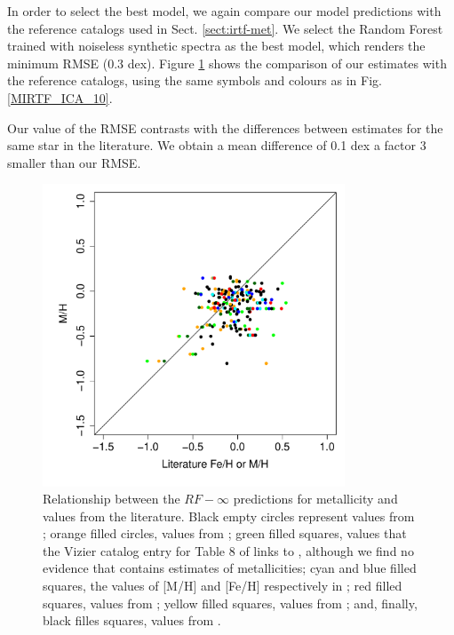 In order to select the best model, we again compare our model
predictions with the reference catalogs used in
Sect. \ref{sect:irtf-met}. We select the Random Forest trained with
noiseless synthetic spectra as the best model, which renders the
minimum RMSE (0.3 dex). Figure \ref{fig:ipac_mt} shows the comparison
of our estimates with the reference catalogs, using the same symbols
and colours as in Fig. \ref{MIRTF_ICA_10}.

Our value of the RMSE contrasts with the differences between estimates
for the same star in the literature. We obtain a mean difference of
0.1 dex a factor 3 smaller than our RMSE. 

\begin{figure}
 \begin{center} \includegraphics[width=9cm]{figs/ipac-figs/M-RFInf.pdf}

\caption{Relationship
 between the $RF-\infty$ predictions for metallicity and values from
 the literature.  Black empty circles represent values
 from \protect\cite{cesetti} ; orange filled circles, values
 from \protect\cite{NevesIII}; green filled squares, values that the
 Vizier catalog entry for Table 8 of \protect\cite{NevesIII} links
 to \protect\cite{Jao}, although we find no evidence
 that \protect\cite{Jao} contains estimates of metallicities; cyan and
 blue filled squares, the values of [M/H] and [Fe/H] respectively
 in \protect\cite{RA2012}; red filled squares, values
 from \protect\cite{Mann2015}; yellow filled squares, values
 from \protect\cite{Newton2014}; and, finally, black filles squares,
 values
 from \protect\cite{Gaidos2015}.}  \label{fig:ipac_mt} \end{center}
\end{figure}


